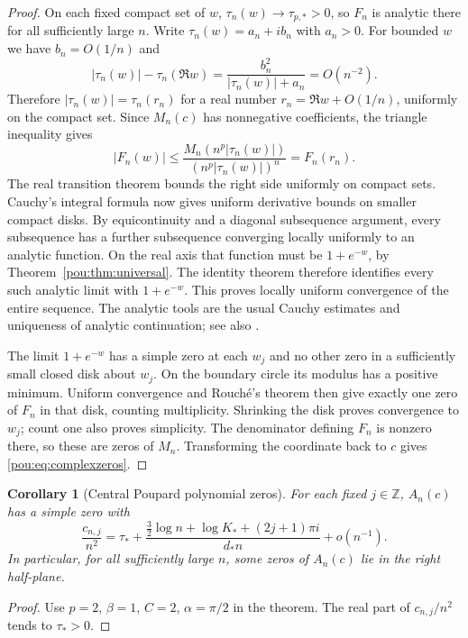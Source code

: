 \documentclass[11pt]{article}
\newtheorem{corollary}[theorem]{Corollary}
\theoremstyle{definition}
\theoremstyle{remark}
\newcommand{\Z}{\mathbb Z}
\begin{document}
\begin{proof}
On each fixed compact set of $w$, $\tau_n(w)\to\tau_{p,*}>0$, so $F_n$
is analytic there for all sufficiently large $n$.  Write
$\tau_n(w)=a_n+ib_n$ with $a_n>0$.
For bounded $w$ we have $b_n=O(1/n)$ and
\[
 |\tau_n(w)|-\tau_n(\Re w)
 =\frac{b_n^2}{|\tau_n(w)|+a_n}=O(n^{-2}).
\]
Therefore $|\tau_n(w)|=\tau_n(r_n)$ for a real number
$r_n=\Re w+O(1/n)$, uniformly on the compact set.
Since $M_n(c)$ has nonnegative coefficients, the triangle inequality gives
\begin{equation}\label{pou:eq:positivecomplexbound}
 |F_n(w)|\le
 \frac{M_n(n^p|\tau_n(w)|)}{(n^p|\tau_n(w)|)^n}
 =F_n(r_n).
\end{equation}
The real transition theorem bounds the right side uniformly on compact
sets.  Cauchy's integral formula now gives uniform derivative bounds on
smaller compact disks.  By equicontinuity and a diagonal subsequence
argument, every subsequence has a further subsequence converging locally
uniformly to an analytic function.  On the real axis that function must
be $1+e^{-w}$, by Theorem~\ref{pou:thm:universal}.  The identity theorem
therefore identifies every such analytic limit with $1+e^{-w}$.
This proves locally uniform convergence of the entire sequence.  The
analytic tools are the usual Cauchy estimates and uniqueness of analytic
continuation; see also \cite{dlmfcomplex}.

The limit $1+e^{-w}$ has a simple zero at each $w_j$ and no other zero in
a sufficiently small closed disk about $w_j$.  On the boundary circle its
modulus has a positive minimum.  Uniform convergence and Rouch\'e's
theorem then give exactly one zero of $F_n$ in that disk, counting
multiplicity.  Shrinking the disk proves convergence to $w_j$; count one
also proves simplicity.  The denominator defining $F_n$ is nonzero
there, so these are zeros of $M_n$.  Transforming the coordinate back to
$c$ gives \eqref{pou:eq:complexzeros}.
\end{proof}

\begin{corollary}[Central Poupard polynomial zeros]\label{pou:cor:poupardzeros}
For each fixed $j\in\Z$, $A_n(c)$ has a simple zero with
\begin{equation}\label{pou:eq:poupardzeros}
 \frac{c_{n,j}}{n^2}=\tau_*+
 \frac{\tfrac32\log n+\log K_*+(2j+1)\pi i}{d_*n}
 +o(n^{-1}).
\end{equation}
In particular, for all sufficiently large $n$, some zeros of $A_n(c)$
lie in the right half-plane.
\end{corollary}
\begin{proof}
Use $p=2$, $\beta=1$, $C=2$, $\alpha=\pi/2$ in the theorem.
The real part of $c_{n,j}/n^2$ tends to $\tau_*>0$.
\end{proof}
\end{document}
